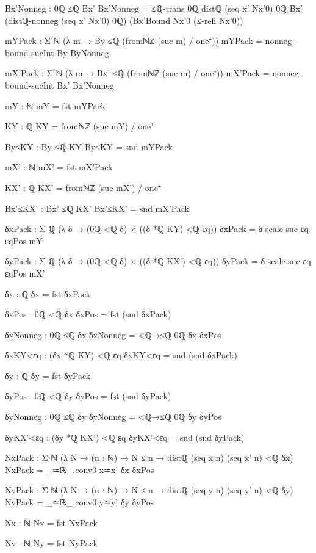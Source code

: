 \documentclass[11pt,a4paper]{book}
\begin{document}
\begin{code}
{        Bx'Nonneg : 0ℚ ≤ℚ Bx'
        Bx'Nonneg =
          ≤ℚ-trans {0ℚ} {distℚ (seq x' Nx'0) 0ℚ} {Bx'}
            (distℚ-nonneg (seq x' Nx'0) 0ℚ)
            (Bx'Bound Nx'0 (≤-refl Nx'0))

        mYPack : Σ ℕ (λ m → By ≤ℚ (fromℕℤ (suc m) / one⁺))
        mYPack = nonneg-bound-sucInt By ByNonneg

        mX'Pack : Σ ℕ (λ m → Bx' ≤ℚ (fromℕℤ (suc m) / one⁺))
        mX'Pack = nonneg-bound-sucInt Bx' Bx'Nonneg

        mY : ℕ
        mY = fst mYPack

        KY : ℚ
        KY = fromℕℤ (suc mY) / one⁺

        By≤KY : By ≤ℚ KY
        By≤KY = snd mYPack

        mX' : ℕ
        mX' = fst mX'Pack

        KX' : ℚ
        KX' = fromℕℤ (suc mX') / one⁺

        Bx'≤KX' : Bx' ≤ℚ KX'
        Bx'≤KX' = snd mX'Pack

        δxPack : Σ ℚ (λ δ → (0ℚ <ℚ δ) × ((δ *ℚ KY) <ℚ εq))
        δxPack = δ-scale-suc εq εqPos mY

        δyPack : Σ ℚ (λ δ → (0ℚ <ℚ δ) × ((δ *ℚ KX') <ℚ εq))
        δyPack = δ-scale-suc εq εqPos mX'

        δx : ℚ
        δx = fst δxPack

        δxPos : 0ℚ <ℚ δx
        δxPos = fst (snd δxPack)

        δxNonneg : 0ℚ ≤ℚ δx
        δxNonneg = <ℚ→≤ℚ {0ℚ} {δx} δxPos

        δxKY<εq : (δx *ℚ KY) <ℚ εq
        δxKY<εq = snd (snd δxPack)

        δy : ℚ
        δy = fst δyPack

        δyPos : 0ℚ <ℚ δy
        δyPos = fst (snd δyPack)

        δyNonneg : 0ℚ ≤ℚ δy
        δyNonneg = <ℚ→≤ℚ {0ℚ} {δy} δyPos

        δyKX'<εq : (δy *ℚ KX') <ℚ εq
        δyKX'<εq = snd (snd δyPack)

        NxPack : Σ ℕ (λ N → (n : ℕ) → N ≤ n → distℚ (seq x n) (seq x' n) <ℚ δx)
        NxPack = _≃ℝ_.conv0 x≃x' δx δxPos

        NyPack : Σ ℕ (λ N → (n : ℕ) → N ≤ n → distℚ (seq y n) (seq y' n) <ℚ δy)
        NyPack = _≃ℝ_.conv0 y≃y' δy δyPos

        Nx : ℕ
        Nx = fst NxPack

        Ny : ℕ
        Ny = fst NyPack

}
\end{code}
\end{document}
